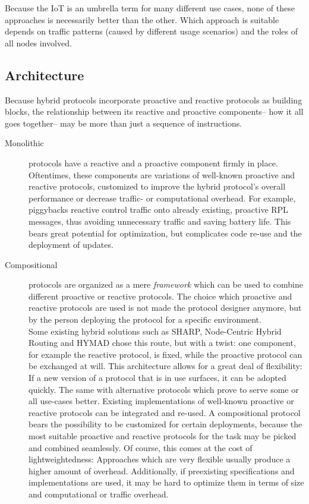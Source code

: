 \documentclass[a4paper,10pt]{scrartcl}
\begin{document}

Because the IoT is an umbrella term for many different use cases, none of these approaches is necessarily better than the other. Which approach is suitable depends on traffic patterns (caused by different usage scenarios) and the roles of all nodes involved.%

\subsection{Architecture}
\label{subsec:architecture}
Because hybrid protocols incorporate proactive and reactive protocols as building blocks, the relationship between its reactive and proactive components-- how it all goes together-- may be more than just a sequence of instructions.
\begin{description}
\item[Monolithic] protocols have a reactive and a proactive component firmly in place. Oftentimes, these components are variations of well-known proactive and reactive protocols, customized to improve the hybrid protocol's overall performance or decrease traffic- or computational overhead. For example, \cite{baccelli_p2p_rpl} piggybacks reactive control traffic onto already existing, proactive RPL messages, thus avoiding unnecessary traffic and saving battery life. %
This bears great potential for optimization, but complicates code re-use and the deployment of updates.\\
\item[Compositional] protocols are organized as a mere \emph{framework} which can be used to combine different proactive or reactive protocols. 
The choice which proactive and reactive protocols are used is not made the protocol designer anymore, but by the person deploying the protocol for a specific environment.\\
Some existing hybrid solutions such as SHARP, Node-Centric Hybrid Routing and HYMAD chose this route, but with a twist: one component, for example the reactive protocol, is fixed, while the proactive protocol can be exchanged at will. This architecture allows for a great deal of flexibility: If a new version of a protocol that is in use surfaces, it can be adopted quickly. The same with alternative protocols which prove to serve some or all use-cases better. Existing implementations of well-known proactive or reactive protocols can be integrated and re-used.
A compositional protocol bears the possibility to be customized for certain deployments, because the most suitable proactive and reactive protocols for the task may be picked and combined seamlessly.
Of course, this comes at the cost of lightweightedness: Approaches which are very flexible usually produce a higher amount of overhead. Additionally, if preexisting specifications and implementations are used, it may be hard to optimize them in terms of size and computational or traffic overhead.
\end{description}
\end{document}
